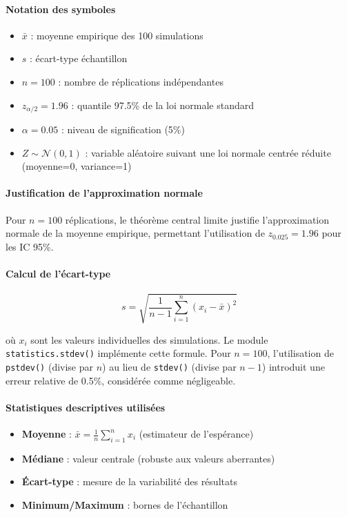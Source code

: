 \documentclass[12pt,a4paper]{article}
\begin{document}
\paragraph{Notation des symboles}
\begin{itemize}
    \item $\bar{x}$ : moyenne empirique des 100 simulations
    \item $s$ : écart-type échantillon
    \item $n = 100$ : nombre de réplications indépendantes
    \item $z_{\alpha/2} = 1.96$ : quantile 97.5\% de la loi normale standard
    \item $\alpha = 0.05$ : niveau de signification (5\%)
    \item $Z \sim \mathcal{N}(0,1)$ : variable aléatoire suivant une loi normale centrée réduite (moyenne=0, variance=1)
\end{itemize}

\paragraph{Justification de l'approximation normale}

Pour $n=100$ réplications, le théorème central limite justifie l'approximation normale de la moyenne empirique, permettant l'utilisation de $z_{0.025} = 1.96$ pour les IC 95\%.

\paragraph{Calcul de l'écart-type}
$$s = \sqrt{\frac{1}{n-1} \sum_{i=1}^{n} (x_i - \bar{x})^2}$$

où $x_i$ sont les valeurs individuelles des simulations. Le module \texttt{statistics.stdev()} implémente cette formule. Pour $n=100$, l'utilisation de \texttt{pstdev()} (divise par $n$) au lieu de \texttt{stdev()} (divise par $n-1$) introduit une erreur relative de 0.5\%, considérée comme négligeable.

\paragraph{Statistiques descriptives utilisées}
\begin{itemize}
    \item \textbf{Moyenne} : $\bar{x} = \frac{1}{n}\sum_{i=1}^{n} x_i$ (estimateur de l'espérance)
    \item \textbf{Médiane} : valeur centrale (robuste aux valeurs aberrantes)
    \item \textbf{Écart-type} : mesure de la variabilité des résultats
    \item \textbf{Minimum/Maximum} : bornes de l'échantillon
\end{itemize}
\end{document}
